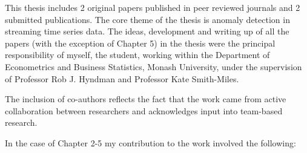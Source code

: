 \documentclass{monashthesis}
\theoremstyle{definition}
\theoremstyle{definition}
\theoremstyle{definition}
\theoremstyle{remark}
\begin{document}
This thesis includes 2 original papers published in peer reviewed journals and 2 submitted publications. The core theme of the thesis is anomaly detection in streaming time series data. The ideas, development and writing up of all the papers (with the exception of Chapter 5) in the thesis were the principal responsibility of myself, the student, working within the Department of Econometrics and Business Statistics, Monash University, under the supervision of Professor Rob J. Hyndman and Professor Kate Smith-Miles.

The inclusion of co-authors reflects the fact that the work came from active collaboration between researchers and acknowledges input into team-based research.

In the case of Chapter 2-5 my contribution to the work involved the following:
\end{document}
